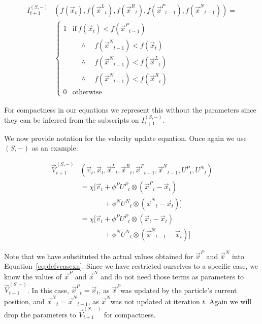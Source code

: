 \documentclass[journal,letterpaper]{IEEEtran}
\providecommand{\pers}{\ensuremath{P}}
\providecommand{\neigh}{\ensuremath{N}}
\providecommand{\leftind}{\ensuremath{L}}
\providecommand{\rightind}{\ensuremath{R}}
\providecommand{\nURand}{\ensuremath{U^\neigh}}
\providecommand{\pURand}{\ensuremath{U^\pers}}
\providecommand{\ppos}{\ensuremath{\Vec{x}}}
\providecommand{\pvel}{\ensuremath{\Vec{v}}}
\providecommand{\nbest}{\ensuremath{\Vec{x}^\neigh}}
\providecommand{\pbest}{\ensuremath{\Vec{x}^\pers}}
\providecommand{\constriction}{\ensuremath{\chi}}
\providecommand{\ncoeff}{\ensuremath{\phi^\neigh}}
\providecommand{\pcoeff}{\ensuremath{\phi^\pers}}
\providecommand{\ofunc}{\ensuremath{f}}
\providecommand{\indic}{\ensuremath{I}}
\providecommand{\specvel}{\ensuremath{\vec{V}}}
\providecommand{\leftn}{\ensuremath{\Vec{x}^\leftind}}
\providecommand{\rightn}{\ensuremath{\Vec{x}^\rightind}}
\providecommand{\casexn}{\ensuremath{(S,-)}}
\begin{document}
\begin{align}
  \nonumber
	\indic_{t+1}^{\casexn} & (\ofunc ( \ppos_{t} ) ,\ofunc(\leftn_{t}),
	\ofunc(\rightn_{t}) ,\ofunc(\pbest_{t-1}) ,\ofunc(\nbest_{t-1}))= \\
  \label{eq:deficasexn}
	&\begin{cases}
	   1 & \text{if} \ \ofunc(\ppos_{t}) < \ofunc(\pbest_{t-1}) \\
	   &\quad \wedge \quad \ofunc(\nbest_{t-1}) < \ofunc(\ppos_{t}) \\
	   &\quad \wedge \quad \ofunc(\nbest_{t-1}) < \ofunc(\leftn_{t}) \\
	   &\quad \wedge \quad \ofunc(\nbest_{t-1}) < \ofunc(\rightn_{t}) \\
	   0 & \text{otherwise}
	\end{cases}
\end{align}

For compactness in our equations we represent this without the parameters since
they can be inferred from the subscripts on $\indic_{t+1}^{\casexn}$.

We now provide notation for the velocity update equation.  Once again we use
$\casexn$ as an example:

\begin{align}
\nonumber
	\specvel_{t+1}^{\casexn} & (\pvel_t, \ppos_{t}, \leftn_{t}, \rightn_{t},
	\pbest_{t-1}, \nbest_{t-1}, \pURand_{t}, \nURand_{t}) \\
\nonumber
		&= \constriction \bigl[ \pvel_{t} +
			\pcoeff\pURand_{t}\otimes(\pbest_{t} - \ppos_{t}) \\
\nonumber
		& \quad \quad \quad \; + \ncoeff\nURand_{t}\otimes(\nbest_{t} -
		\ppos_{t}) \bigr] \\
\nonumber
		&= \constriction \bigl[ \pvel_{t} +
			\pcoeff\pURand_{t}\otimes(\ppos_{t} - \ppos_{t}) \\
\label{eq:defvcasexn}
			& \quad \quad \quad \; + \ncoeff\nURand_{t}\otimes(\nbest_{t-1} -
			\ppos_{t}) \bigr]
\end{align}

Note that we have substituted the actual values obtained for $\pbest$ and
$\nbest$ into Equation~\eqref{eq:defvcasexn}.  Since we have restricted
ourselves to a specific case, we know the values of $\pbest$ and $\nbest$ and
do not need those terms as parameters to $\specvel_{t+1}^{\casexn}$.  In this
case, $\pbest_{t}=\ppos_{t}$, as \pbest was updated by the particle's current
position, and $\nbest_{t}=\nbest_{t-1}$, as \nbest was not updated at iteration
$t$.  Again we will drop the parameters to $\specvel_{t+1}^{\casexn}$ for
compactness.
\end{document}
